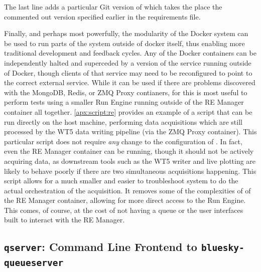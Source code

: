 The last line adds a particular Git version of \wrighttools which takes the place the commented out version specified earlier in the requirements file.

Finally, and perhaps most powerfully, the modularity of the Docker system can be used to run parts of the system outside of docker itself, thus enabling more traditional development and feedback cycles.
Any of the Docker containers can be independently halted and superceded by a version of the service running outside of Docker, though clients of that service may need to be reconfigured to point to the correct external service.
While it can be used if there are problems discovered with the MongoDB, Redis, or ZMQ Proxy contianers, for \biab this is most useful to perform tests using a smaller Run Engine running outside of the RE Manager container all together.
\ref{apx:script:re} provides an example of a script that can be run directly on the host machine, performing data acquisitions which are still processed by the WT5 data writing pipeline (via the ZMQ Proxy container).
This particular script does not require \textit{any} change to the configuration of \biab.
In fact, even the RE Manager container can be running, though it should not be actively acquiring data, as downstream tools such as the WT5 writer and live plotting are likely to behave poorly if there are two simultaneous acquisitions happening.
This script allows for a much smaller and easier to troubleshoot system to do the actual orchestration of the acquisition.
It removes some of the complexities of of the RE Manager container, allowing for more direct access to the Run Engine.
This comes, of course, at the cost of not having a queue or the user interfaces built to interact with the RE Manager.







\subsection{\texttt{qserver}: Command Line Frontend to \texttt{bluesky-queueserver}}


